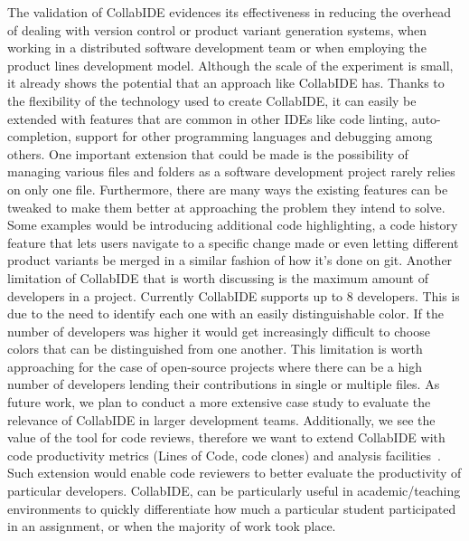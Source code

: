 The validation of CollabIDE evidences its effectiveness in reducing the overhead of dealing with version 
control or product variant generation systems, when working in a distributed software development team 
or when employing the product lines development model.
Although the scale of the experiment is small, it already shows the potential that an approach like 
CollabIDE has. Thanks to the flexibility of the technology used to create CollabIDE, it can easily be 
extended with features that are common in other IDEs like code linting, auto-completion, support for 
other programming languages and debugging among others. One important extension that could be 
made is the possibility of managing various files and folders as a software development project rarely 
relies on only one file. Furthermore, there are many ways the existing features can be tweaked to make 
them better at approaching the problem they intend to solve. Some examples would be introducing 
additional code highlighting, a code history feature that lets users navigate to a specific change made 
or even letting different product variants be merged in a similar fashion of how it’s done on git. Another 
limitation of CollabIDE that is worth discussing is the maximum amount of developers in a project. Currently CollabIDE supports
up to 8 developers. This is due to the need to identify each one with an easily distinguishable color.
If the number of developers was higher it would get increasingly difficult to choose colors that can be distinguished from one another.
This limitation is worth approaching for the case of open-source projects
where there can be a high number of developers lending their contributions in single or multiple files.
As future work, we plan to conduct a more extensive case study to evaluate the relevance of CollabIDE 
in larger development teams. Additionally, we see the value of the tool for code reviews, therefore we 
want to extend CollabIDE with code productivity metrics (\eg Lines of Code, code clones) and analysis 
facilities~\cite{lienhard12}. Such extension would enable code reviewers to better evaluate the 
productivity of particular developers. CollabIDE, can be particularly useful in academic/teaching 
environments to quickly differentiate how much a particular student participated in an assignment, or 
when the majority of work took place.


\endinput

